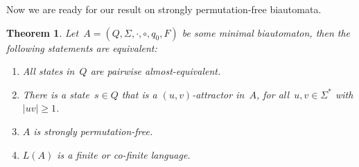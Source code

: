 \documentclass[submission]{eptcs}
\newtheorem{theorem}{Theorem}
\begin{document}
Now we are ready for our result on strongly permutation-free
biautomata.

\begin{theorem}\label{thm:dbia-characterization-almost-co-finite}
  Let~$A=(Q,\Sigma,\cdot,\circ,q_0,F)$ be some \emph{minimal} biautomaton,
  then the following statements are equivalent:
  \begin{enumerate}
  \item All states in~$Q$ are pairwise
    almost-equivalent.  \label{item:dbia-charact-almost}
  \item There is a state~$s\in Q$ that is a $(u,v)$-attractor in~$A$,
    for all~$u,v\in\Sigma^*$ with $|uv|\geq
    1$. \label{item:dbia-charact-attractor}
  \item $A$ is strongly
    permutation-free.  \label{item:dbia-charact-permutation}
  \item $L(A)$ is a finite or co-finite
    language.\label{item:dbia-charact-definite}
  \end{enumerate}  
\end{theorem}
\end{document}
